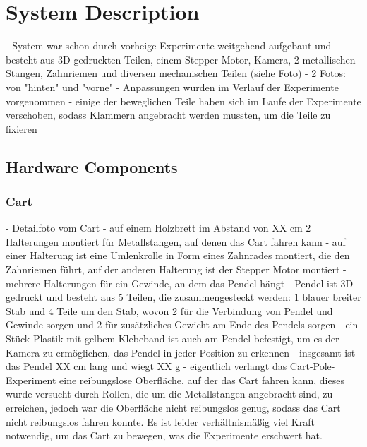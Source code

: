 \chapter{System Description}

- System war schon durch vorheige Experimente weitgehend aufgebaut und besteht aus 3D gedruckten Teilen, einem Stepper Motor, Kamera, 2 metallischen Stangen, Zahnriemen und diversen mechanischen Teilen (siehe Foto)
- 2 Fotos: von "hinten" und "vorne"
- Anpassungen wurden im Verlauf der Experimente vorgenommen
- einige der beweglichen Teile haben sich im Laufe der Experimente verschoben, sodass Klammern angebracht werden mussten, um die Teile zu fixieren

\section{Hardware Components}
\subsection{Cart}
- Detailfoto vom Cart
- auf einem Holzbrett im Abstand von XX cm 2 Halterungen montiert für Metallstangen, auf denen das Cart fahren kann
- auf einer Halterung ist eine Umlenkrolle in Form eines Zahnrades montiert, die den Zahnriemen führt, auf der anderen Halterung ist der Stepper Motor montiert
- mehrere Halterungen für ein Gewinde, an dem das Pendel hängt
- Pendel ist 3D gedruckt und besteht aus 5 Teilen, die zusammengesteckt werden: 1 blauer breiter Stab und 4 Teile um den Stab, wovon 2 für die Verbindung von Pendel und Gewinde sorgen und 2 für zusätzliches Gewicht am Ende des Pendels sorgen
- ein Stück Plastik mit gelbem Klebeband ist auch am Pendel befestigt, um es der Kamera zu ermöglichen, das Pendel in jeder Position zu erkennen
- insgesamt ist das Pendel XX cm lang und wiegt XX g
- eigentlich verlangt das Cart-Pole-Experiment eine reibungslose Oberfläche, auf der das Cart fahren kann, dieses wurde versucht durch Rollen, die um die Metallstangen angebracht sind, zu erreichen, jedoch war die Oberfläche nicht reibungslos genug, sodass das Cart nicht reibungslos fahren konnte. Es ist leider verhältnismäßig viel Kraft notwendig, um das Cart zu bewegen, was die Experimente erschwert hat.

